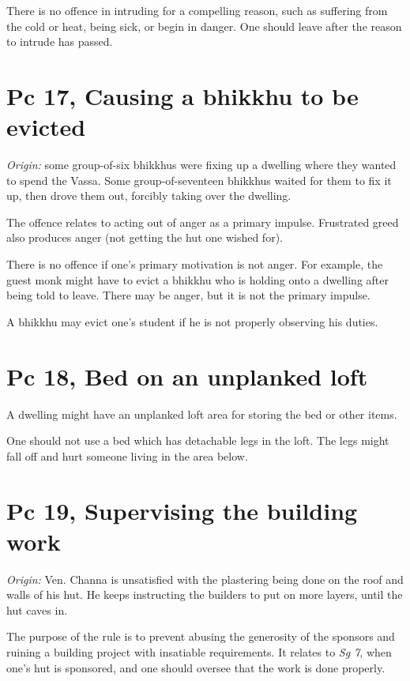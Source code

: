 There is no offence in intruding for a compelling reason, such as
suffering from the cold or heat, being sick, or begin in danger. One
should leave after the reason to intrude has passed.

\clearpage

\section{Pc 17, Causing a bhikkhu to be evicted}

\emph{Origin:} some group-of-six bhikkhus were fixing up a dwelling
where they wanted to spend the Vassa. Some group-of-seventeen bhikkhus
waited for them to fix it up, then drove them out, forcibly taking over
the dwelling.

The offence relates to acting out of anger as a primary impulse.
Frustrated greed also produces anger (not getting the hut one wished
for).

There is no offence if one's primary motivation is not anger. For
example, the guest monk might have to evict a bhikkhu who is holding
onto a dwelling after being told to leave. There may be anger, but it is
not the primary impulse.

A bhikkhu may evict one's student if he is not properly observing his
duties.

\section{Pc 18, Bed on an unplanked loft}

A dwelling might have an unplanked loft area for storing the bed or
other items.

One should not use a bed which has detachable legs in the loft. The legs
might fall off and hurt someone living in the area below.

\section{Pc 19, Supervising the building work}

\emph{Origin:} Ven. Channa is unsatisfied with the plastering being done
on the roof and walls of his hut. He keeps instructing the builders to
put on more layers, until the hut caves in.

The purpose of the rule is to prevent abusing the generosity of the
sponsors and ruining a building project with insatiable requirements. It
relates to \emph{Sg 7}, when one's hut is sponsored, and one should
oversee that the work is done properly.

